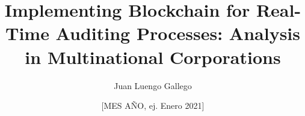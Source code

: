 
\newcommand{\Estudios}{Grado}

\newcommand{\TituloEstudios}{Administración y Dirección de Empresas}

\newcommand{\Departamento}{Ingeniería de Organización, Administración de Empresas y Estadística}

\newcommand{\NombreAutor}{Juan Luengo Gallego}

\newcommand{\NombreTutor}{Pilar Quevedo}

\newcommand{\TituloTFG}{Implementing Blockchain for Real-Time Auditing Processes: Analysis in Multinational Corporations}

\newcommand{\Fecha}{[MES AÑO, ej. Enero 2021]}

\title{\TituloTFG}
\author{\NombreAutor}
\date{\Fecha}

